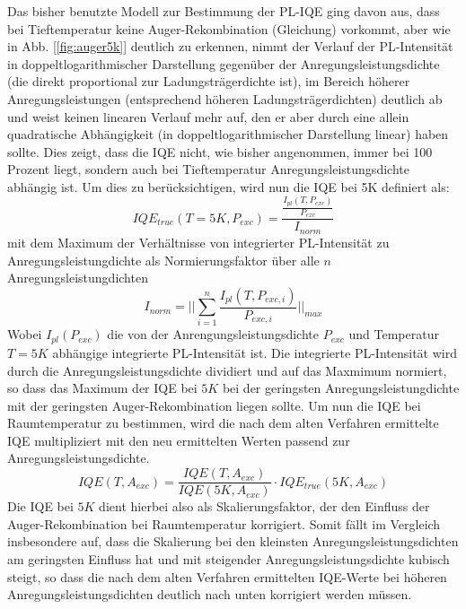 \vspace{1cm}
\raggedright
Das bisher benutzte Modell zur Bestimmung der PL-IQE ging davon aus, dass bei Tieftemperatur keine Auger-Rekombination (Gleichung) vorkommt, aber wie in Abb. [\ref{fig:auger5k}] deutlich zu erkennen, nimmt der Verlauf der PL-Intensität in doppeltlogarithmischer Darstellung gegenüber der Anregungsleistungsdichte (die direkt proportional zur Ladungsträgerdichte ist), im Bereich höherer Anregungsleistungen (entsprechend höheren Ladungsträgerdichten) deutlich ab und weist keinen linearen Verlauf mehr auf, den er aber durch eine allein quadratische Abhängigkeit (in doppeltlogarithmischer Darstellung linear) haben sollte. Dies zeigt, dass die IQE nicht, wie bisher angenommen, immer bei 100 Prozent liegt, sondern auch bei Tieftemperatur Anregungsleistungsdichte abhängig ist. Um dies zu berücksichtigen, wird nun die IQE bei 5K definiert als:
%
\begin{equation}
    IQE_{true}(T = 5K, P_{exc}) = \frac{ \frac{I_{pl}(T,P_{exc}) }{P_{exc} } } { I_{norm}}
    \label{eq:iqetrue5k}
\end{equation}
%
mit dem Maximum der Verhältnisse von integrierter PL-Intensität zu Anregungsleistungdichte als  Normierungsfaktor über alle $n$ Anregungsleistungdichten
\begin{equation}
    I_{norm} = \lvert \lvert \sum_{i=1}^{n} \frac{I_{pl}(T,P_{exc,i})}{P_{exc,i}} \lvert \lvert_{max}
    \label{eq:iplnorm}
\end{equation}
%
Wobei $I_{pl}(P_{exc})$ die von der Anrengungsleistungsdichte $P_{exc}$ und Temperatur $T = 5K$ abhängige integrierte PL-Intensität ist. Die integrierte PL-Intensität wird durch die Anregungsleistungsdichte dividiert und auf das Maxmimum normiert, so dass das Maximum der IQE bei $5K$ bei der geringsten Anregungsleistungdichte mit der geringsten Auger-Rekombination liegen sollte. Um nun die IQE bei Raumtemperatur zu bestimmen, wird die nach dem alten Verfahren ermittelte IQE multipliziert mit den neu ermittelten Werten passend zur Anregungsleistungsdichte. 
%
\begin{equation}
    IQE(T, A_{exc}) = \frac{IQE(T,A_{exc})}{IQE(5K,A_{exc})} \cdot IQE_{true}(5K,A_{exc})
\end{equation}
%
Die IQE bei $5K$ dient hierbei also als Skalierungsfaktor, der den Einfluss der Auger-Rekombination bei Raumtemperatur korrigiert. Somit fällt im Vergleich insbesondere auf, dass die Skalierung bei den kleinsten Anregungsleistungsdichten am geringsten Einfluss hat und mit steigender Anregungsleistungsdichte kubisch steigt, so dass die nach dem alten Verfahren ermittelten IQE-Werte bei höheren Anregungsleistungsdichten deutlich nach unten korrigiert werden müssen. 
